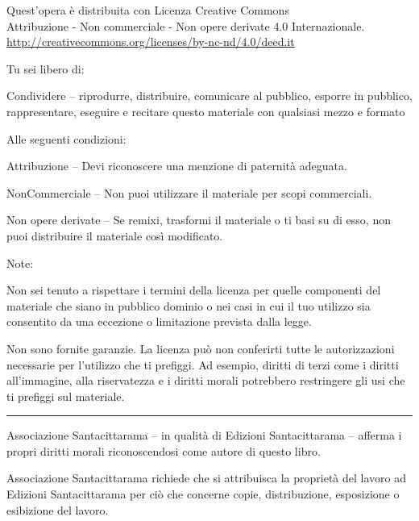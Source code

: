 \vspace*{-2.5\baselineskip}
\enlargethispage{\baselineskip}

{\copyrightsize\setlength{\parindent}{0pt}%
\raggedright\label{copyright-details}
\setlength{\parskip}{3pt}
{\centering

{\large\ccbyncnd}

Quest'opera è distribuita con Licenza Creative Commons\\
Attribuzione - Non commerciale - Non opere derivate 4.0 Internazionale.\\
\href{http://creativecommons.org/licenses/by-nc-nd/4.0/deed.it}{http://creativecommons.org/licenses/by-nc-nd/4.0/deed.it}

}

Tu sei libero di:
\begin{packeditemize}
  \item Condividere -- riprodurre, distribuire, comunicare al pubblico, esporre in pubblico, rappresentare, eseguire e recitare questo materiale con qualsiasi mezzo e formato
\end{packeditemize}

Alle seguenti condizioni:

\begin{packeditemize}
\item Attribuzione -- Devi riconoscere una menzione di paternità adeguata.
\item NonCommerciale -- Non puoi utilizzare il materiale per scopi commerciali.
\item Non opere derivate -- Se remixi, trasformi il materiale o ti basi su di esso, non puoi distribuire il materiale così modificato.
\end{packeditemize}

Note:

Non sei tenuto a rispettare i termini della licenza per quelle componenti del
materiale che siano in pubblico dominio o nei casi in cui il tuo utilizzo sia
consentito da una eccezione o limitazione prevista dalla legge.

Non sono fornite garanzie. La licenza può non conferirti tutte le autorizzazioni
necessarie per l'utilizzo che ti prefiggi. Ad esempio, diritti di terzi come i
diritti all'immagine, alla riservatezza e i diritti morali potrebbero
restringere gli usi che ti prefiggi sul materiale.

{\centering
  \color[gray]{0.4}\rule{0.4\linewidth}{0.1pt}%
\par}

Associazione Santacittarama -- in qualità di Edizioni Santacittarama -- afferma
i propri diritti morali riconoscendosi come autore di questo libro.

Associazione Santacittarama richiede che si attribuisca la proprietà del lavoro
ad Edizioni Santacittarama per ciò che concerne copie, distribuzione,
esposizione o esibizione del lavoro.

}
